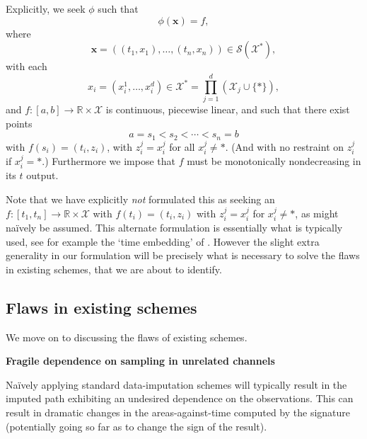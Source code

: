 \documentclass{article}
\renewcommand{\subsubsection}[1]{\textbf{#1}

} %
\newcommand{\reals}{\mathbb{R}}
\newcommand{\dataspace}{\mathcal{X}}
\newcommand{\seriesspace}{\mathcal{S}}
\begin{document}
Explicitly, we seek $\phi$ such that
\begin{equation}\label{eq:phi}
\phi(\mathbf{x}) = f,    
\end{equation}
where
\begin{equation*}
\mathbf{x} = ((t_1, x_1), \ldots, (t_n, x_n)) \in \seriesspace(\dataspace^*),    
\end{equation*}
with each
\begin{equation*}
    x_i = (x_i^1, \ldots, x_i^d) \in \dataspace^* = \prod_{j = 1}^d (\dataspace_j \cup \{*\}),
\end{equation*}
and $f \colon [a, b] \to \reals \times \dataspace$ is continuous, piecewise linear, and such that there exist points
\begin{equation}\label{eq:ss}
a = s_1 < s_2 < \cdots < s_n = b    
\end{equation}
with $f(s_i) = (t_i, z_i)$, with $z_i^j = x_i^j$ for all $x_i^j \neq *$. (And with no restraint on $z_i^j$ if $x_i^j = *$.) Furthermore we impose that $f$ must be monotonically nondecreasing in its $t$ output.



Note that we have explicitly \emph{not} formulated this as seeking an $f \colon [t_1, t_n] \to \reals \times \dataspace$ with $f(t_i) = (t_i, z_i)$ with $z_i^j = x_i^j$ for $x_i^j \neq *$, as might na{\"i}vely be assumed. This alternate formulation is essentially what is typically used, see for example the `time embedding' of \cite{fermanian2019embedding}. However the slight extra generality in our formulation will be precisely what is necessary to solve the flaws in existing schemes, that we are about to identify.

\subsection{Flaws in existing schemes}\label{section:flaws}
We move on to discussing the flaws of existing schemes.

\subsubsection{Fragile dependence on sampling in unrelated channels}
Na{\"i}vely applying standard data-imputation schemes will typically result in the imputed path exhibiting an undesired dependence on the observations. This can result in dramatic changes in the areas-against-time computed by the signature (potentially going so far as to change the sign of the result).
\end{document}
